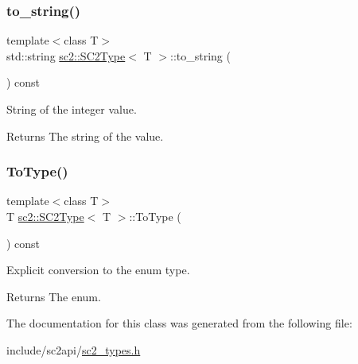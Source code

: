 \subsubsection{\texorpdfstring{to\+\_\+string()}{to\_string()}}
{\footnotesize\ttfamily template$<$class T$>$ \\
std\+::string \hyperlink{classsc2_1_1_s_c2_type}{sc2\+::\+S\+C2\+Type}$<$ T $>$\+::to\+\_\+string (\begin{DoxyParamCaption}{ }\end{DoxyParamCaption}) const\hspace{0.3cm}{\ttfamily [inline]}}

String of the integer value. \begin{DoxyReturn}{Returns}
The string of the value. 
\end{DoxyReturn}
\mbox{\label{classsc2_1_1_s_c2_type_ada2d70972edaa615780f86165b7e87a3}} 
\subsubsection{\texorpdfstring{To\+Type()}{ToType()}}
{\footnotesize\ttfamily template$<$class T$>$ \\
T \hyperlink{classsc2_1_1_s_c2_type}{sc2\+::\+S\+C2\+Type}$<$ T $>$\+::To\+Type (\begin{DoxyParamCaption}{ }\end{DoxyParamCaption}) const\hspace{0.3cm}{\ttfamily [inline]}}

Explicit conversion to the enum type. \begin{DoxyReturn}{Returns}
The enum. 
\end{DoxyReturn}


The documentation for this class was generated from the following file\+:\begin{DoxyCompactItemize}
\item 
include/sc2api/\hyperlink{sc2__types_8h}{sc2\+\_\+types.\+h}\end{DoxyCompactItemize}
